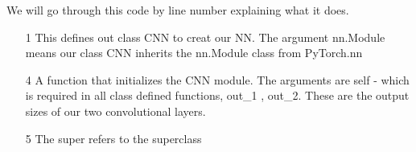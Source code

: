 \documentclass[12pt]{extarticle}
\newcommand{\<}{\langle}
\renewcommand{\>}{\rangle}
\theoremstyle{definition}
\begin{document}
We will go through this code by line number explaining what it does.
\begin{itemize}
	\item [1] This defines out class CNN to creat our NN.  The argument nn.Module means our class CNN inherits the nn.Module class from PyTorch.nn
	\item [4] A function that initializes the CNN module.  The arguments are self - which is required in all class defined functions, out\_1 , out\_2.  These are the output sizes of our two convolutional layers.  
	\item [5] The super refers to the superclass
\end{itemize}
	
	
\end{document}
